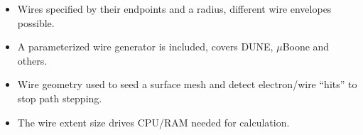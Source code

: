 \documentclass[xcolor=dvipsnames]{beamer}
\begin{document}
\begin{frame}
\begin{columns}
\begin{column}{0.5\textwidth}
        \footnotesize
      \begin{itemize}
      \item Wires specified by their endpoints and a radius, 
        different wire envelopes possible.
      \item A parameterized wire generator is included, covers DUNE, $\mu$Boone and
        others.
      \item Wire geometry used to seed a surface mesh and detect
        electron/wire ``hits'' to stop path stepping.
      \item The wire extent size drives CPU/RAM needed for calculation.
      \end{itemize}
    \end{column}
  \end{columns}

\end{frame}
\end{document}
